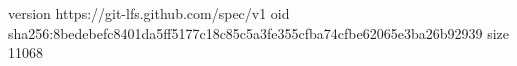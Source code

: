 version https://git-lfs.github.com/spec/v1
oid sha256:8bedebefc8401da5ff5177c18c85c5a3fe355cfba74cfbe62065e3ba26b92939
size 11068
